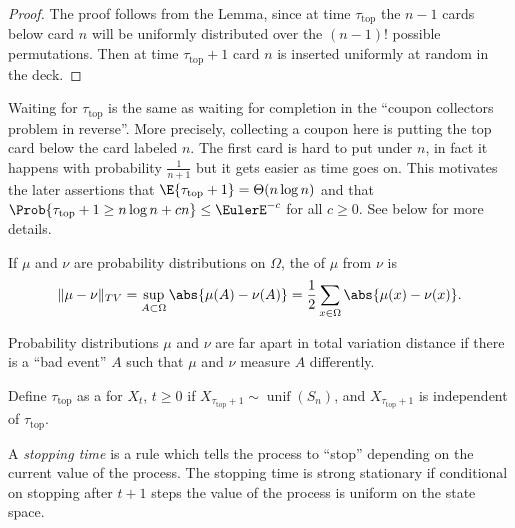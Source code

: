 \documentclass[12pt]{article}
\begin{document}
\begin{proof}
    The proof follows from the Lemma, since at time \( \tau_{\text{top}}
    \) the \( n-1 \) cards below card \( n \) will be uniformly
    distributed over the \( (n-1)! \) possible permutations.  Then at
    time \( \tau_{\text {top}}+ 1 \) card \( n \) is inserted uniformly
    at random in the deck.
\end{proof}

\begin{remark}
    Waiting for \( \tau_{\text{top}} \) is the same as waiting for
    completion in the ``coupon collectors problem in reverse''.  More
    precisely, collecting a coupon here is putting the top card below
    the card labeled \( n \).  The first card is hard to put under \( n \),
    in fact it happens with probability \( \frac{1}{n+1} \) but it gets
    easier as time goes on.  This motivates the later assertions that \( \E{\tau_
    {\text{top}} + 1} = \Theta(n \log n) \) and that \( \Prob{\tau_{\text
    {top}}+1 \ge n \log n + c n} \le \EulerE^{-c} \) for all \( c \ge 0 \).
    See below for more details.
\end{remark}

\begin{definition}
    If \( \mu \) and \( \nu \) are probability distributions on \(
    \Omega \), the  of \( \mu \) from \(
    \nu \) is%
    \[
        \| \mu - \nu \|_{TV} = \sup_{A \subset \Omega} \abs{ \mu(A) -
        \nu(A)} = \frac{1}{2} \sum\limits_{x \in \Omega} \abs{ \mu(x) -
        \nu(x)}.
    \]
\end{definition}

\begin{remark}
    Probability distributions \( \mu \) and \( \nu \) are far apart in
    total variation distance if there is a ``bad event'' \( A \) such
    that \( \mu \) and \( \nu \) measure \( A \) differently.
\end{remark}

\begin{definition}
    Define \( \tau_{\text{top}} \) as a %
    for \( X_t \), \( t \ge 0 \) if \( X_{\tau_{\text{top}}+1} \sim
    \operatorname{unif}
    (S_n) \), and \( X_{\tau_{\text{top}}+1} \) is independent of \(
    \tau_{\text{top}} \).
\end{definition}

\begin{remark}
    A \emph{stopping time} is a rule which tells the process to ``stop''
    depending on the current value of the process.  The stopping time is
    strong stationary if conditional on stopping after \( t+1 \) steps the
    value of the process is uniform on the state space.
\end{remark}
\end{document}
